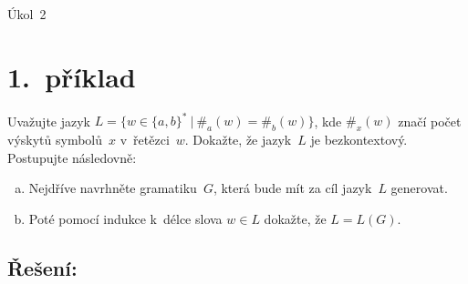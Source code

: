 \documentclass[a4paper, 11pt]{scrartcl}
\newcommand{\NUMBER}{2}
\begin{document}
	\begin{center}
		{\Large Úkol~\NUMBER}
	\end{center}


	\section*{1.~příklad}

	Uvažujte jazyk $ L = \{w \in \{a, b\}^*\ |\ \#_a(w) = \#_b(w)\} $, kde
	$ \#_x(w) $ značí počet výskytů symbolů~$ x $ v~řetězci~$ w $. Dokažte,
	že jazyk~$ L $ je bezkontextový. Postupujte následovně:
	\begin{enumerate}[(a)]
		\item
			Nejdříve navrhněte gramatiku~$ G $, která bude mít za cíl
			jazyk~$ L $ generovat.

		\item
			Poté pomocí indukce k~délce slova $ w \in L $ dokažte, že $ L =
			L(G) $.
	\end{enumerate}

	\subsection*{Řešení:}
\end{document}
